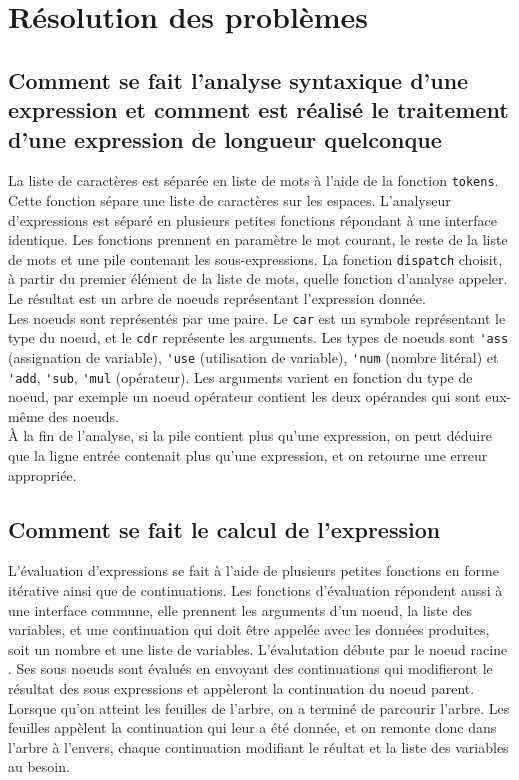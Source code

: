 \documentclass[a4paper,12pt,french]{article}
\begin{document}
	\section{Résolution des problèmes}
	\renewcommand{\thesubsection}{(\alph{subsection})}
	\subsection{Comment se fait l'analyse syntaxique d'une expression et comment est réalisé le traitement d'une expression de longueur quelconque}
	La liste de caractères est séparée en liste de mots à l'aide de la fonction \lstinline$tokens$. Cette fonction sépare une liste de caractères sur les espaces. L'analyseur d'expressions est séparé en plusieurs petites fonctions répondant à une interface identique. Les fonctions prennent en paramètre le mot courant, le reste de la liste de mots et une pile contenant les sous-expressions. La fonction \lstinline$dispatch$ choisit, à partir du premier élément de la liste de mots, quelle fonction d'analyse appeler. Le résultat est un arbre de noeuds représentant l'expression donnée.\\
        
        Les noeuds sont représentés par une paire. Le \lstinline$car$ est un symbole représentant le type du noeud, et le \lstinline$cdr$ représente les arguments. Les types de noeuds sont \lstinline$'ass$ (assignation de variable), \lstinline$'use$ (utilisation de variable), \lstinline$'num$ (nombre litéral) et \lstinline$'add$, \lstinline$'sub$, \lstinline$'mul$ (opérateur). Les arguments varient en fonction du type de noeud, par exemple un noeud opérateur contient les deux opérandes qui sont eux-même des noeuds.\\

        À la fin de l'analyse, si la pile contient plus qu'une expression, on peut déduire que la ligne entrée contenait plus qu'une expression, et on retourne une erreur appropriée.
	\subsection{Comment se fait le calcul de l'expression}
	L'évaluation d'expressions se fait à l'aide de plusieurs petites fonctions en forme itérative ainsi que de continuations. Les fonctions d'évaluation répondent aussi à une interface commune, elle prennent les arguments d'un noeud, la liste des variables, et une continuation qui doit être appelée avec les données produites, soit un nombre et une liste de variables. L'évalutation débute par le noeud \og racine \fg{}. Ses sous noeuds sont évalués en envoyant des continuations qui modifieront le résultat des sous expressions et appèleront la continuation du noeud parent. Lorsque qu'on atteint les feuilles de l'arbre, on a terminé de parcourir l'arbre. Les feuilles appèlent la continuation qui leur a été donnée, et on remonte donc dans l'arbre à l'envers, chaque continuation modifiant le réultat et la liste des variables au besoin.\\
\end{document}
